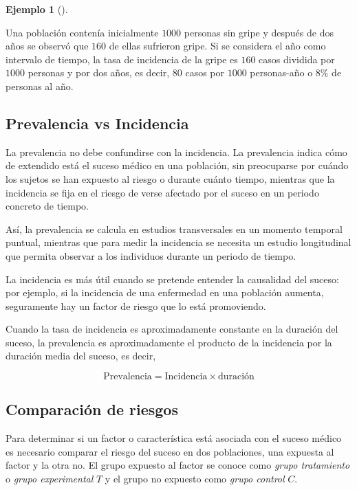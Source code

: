 \documentclass[
  spanish,
  a4paper,
]{scrreport}
\theoremstyle{plain}
\theoremstyle{definition}
\newtheorem{example}{Ejemplo}[chapter]
\theoremstyle{definition}
\theoremstyle{remark}
\begin{document}
\begin{example}[]\protect\hypertarget{exm-riesgo-absoluto}{}\label{exm-riesgo-absoluto}

Una población contenía inicialmente \(1000\) personas sin gripe y
después de dos años se observó que \(160\) de ellas sufrieron gripe. Si
se considera el año como intervalo de tiempo, la tasa de incidencia de
la gripe es \(160\) casos dividida por \(1000\) personas y por dos años,
es decir, \(80\) casos por \(1000\) personas-año o 8\% de personas al
año.

\end{example}

\subsection{Prevalencia vs Incidencia}\label{prevalencia-vs-incidencia}

La prevalencia no debe confundirse con la incidencia. La prevalencia
indica cómo de extendido está el suceso médico en una población, sin
preocuparse por cuándo los sujetos se han expuesto al riesgo o durante
cuánto tiempo, mientras que la incidencia se fija en el riesgo de verse
afectado por el suceso en un periodo concreto de tiempo.

Así, la prevalencia se calcula en estudios transversales en un momento
temporal puntual, mientras que para medir la incidencia se necesita un
estudio longitudinal que permita observar a los individuos durante un
periodo de tiempo.

La incidencia es más útil cuando se pretende entender la causalidad del
suceso: por ejemplo, si la incidencia de una enfermedad en una población
aumenta, seguramente hay un factor de riesgo que lo está promoviendo.

Cuando la tasa de incidencia es aproximadamente constante en la duración
del suceso, la prevalencia es aproximadamente el producto de la
incidencia por la duración media del suceso, es decir,

\[ \mbox{Prevalencia} = \mbox{Incidencia} \times \mbox{duración}\]

\subsection{Comparación de riesgos}\label{comparaciuxf3n-de-riesgos}

Para determinar si un factor o característica está asociada con el
suceso médico es necesario comparar el riesgo del suceso en dos
poblaciones, una expuesta al factor y la otra no. El grupo expuesto al
factor se conoce como \emph{grupo tratamiento} o \emph{grupo
experimental} \(T\) y el grupo no expuesto como \emph{grupo control}
\(C\).
\end{document}

